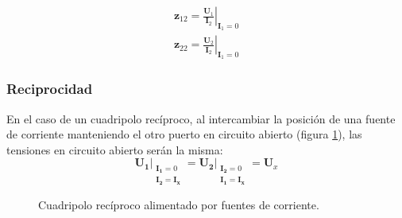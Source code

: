 \[
  \begin{array}{c}
    \mathbf{z}_{12} = \left.\frac{\mathbf{U}_1}{\mathbf{I}_2}\right\rvert_{\mathbf{I}_1 = 0}\\
    \mathbf{z}_{22} = \left.\frac{\mathbf{U}_2}{\mathbf{I}_2}\right\rvert_{\mathbf{I}_1 = 0}
  \end{array}
\]


\subsubsection{Reciprocidad}

En el caso de un cuadripolo recíproco, al intercambiar la posición de una fuente de corriente manteniendo el otro puerto en circuito abierto (figura \ref{fig:impedancia-reciprocidad}), las tensiones en circuito abierto serán la misma:
\[
\left.\mathbf{U_1}\right\rvert_{
  \begin{array}{l}
\mathbf{I_1} = 0\\ \mathbf{I_2} = \mathbf{I_x}
  \end{array}
} =%
\left.\mathbf{U_2}\right\rvert_{
  \begin{array}{l}
\mathbf{I_2} = 0\\ \mathbf{I_1} = \mathbf{I_x}
  \end{array}
} = \mathbf{U}_x
\]

\begin{figure}[H]
  \centering
  \hspace{2cm}
  \caption{Cuadripolo recíproco alimentado por fuentes de corriente.}
  \label{fig:impedancia-reciprocidad}
\end{figure}


